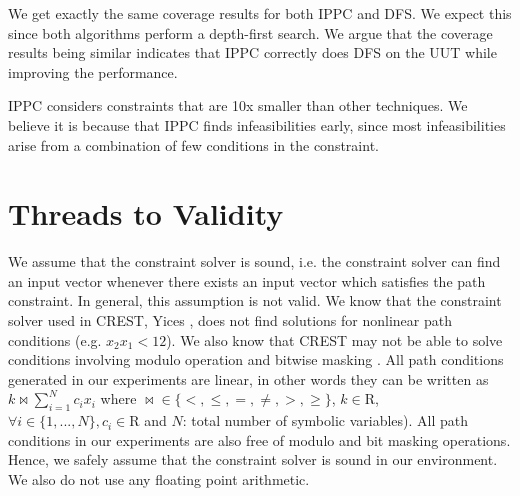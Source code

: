 \documentclass[EPiCempty]{easychair}
\begin{document}
We get exactly the same coverage results for both IPPC and DFS. We expect this since both algorithms perform a depth-first search. We argue that the coverage results being similar indicates that IPPC correctly does DFS on the UUT while improving the performance.

IPPC considers constraints that are 10x smaller than other techniques. We believe it is because that IPPC finds infeasibilities early, since most infeasibilities arise from a combination of few conditions in the constraint.

%
%
%



\section{Threads to Validity}
\label{subsec:threats}
We assume that the constraint solver is sound, i.e. the constraint solver can find an input vector whenever there exists an input vector which satisfies the path constraint. In general, this assumption is not valid. We know that the constraint solver used in CREST, Yices \cite{Yices, Qu:2011:CSC:2082758.2083418}, does not find solutions for nonlinear path conditions (e.g. $x_2 x_1 < 12$). We also know that CREST may not be able to solve conditions involving modulo operation and bitwise masking \cite{Qu:2011:CSC:2082758.2083418}. All path conditions generated in our experiments are linear, in other words they can be written as $k \bowtie \sum_{i=1}^{N} c_i x_i$ where $\bowtie \in \lbrace <, \leq, =, \neq, >, \geq \rbrace$, $k \in \mathrm{R}$, $\forall i \in \lbrace 1, ..., N \rbrace, c_i \in \mathrm{R}$ and $N$: total number of symbolic variables). All path conditions in our experiments are also free of modulo and bit masking operations. Hence, we safely assume that the constraint solver is sound in our environment. We also do not use any floating point arithmetic.
\end{document}
